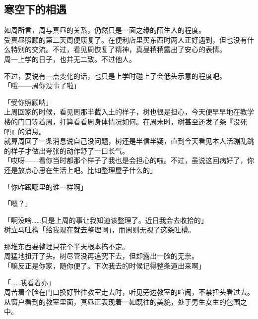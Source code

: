 \subsection{寒空下的相遇}

如周所言，周与真昼的关系，仍然只是一面之缘的陌生人的程度。\\

受真昼照顾的第二天周便康复了。在便利店里买东西时两人正好遇到，但也没有什么特别的交流。不过，看见周恢复了精神，真昼稍稍露出了安心的表情。\\

周一上学的日子，也并无二致。不过他人。

不过，要说有一点变化的话，也只是上学时碰上了会低头示意的程度吧。\\

「哦——周你没事了啦」

「受你照顾呐」\\

上周回家的时候，看见周那半截入土的样子，树也很是担心，今天便早早地在教学楼的门口等着周，打算看看周身体情况如何。在周末时，树甚至还发了条『没死吧』的消息。\\

就算周回了一条消息说自己没问题，树还是半信半疑，直到今天看见本人活蹦乱跳的样子才做出夸张的动作舒了一口长气。\\

「哎呀——看你当时都那个样子了我也是会担心的啦。不过，虽说这回病好了，你还是放点心思在生活上吧。比如整理屋子什么的」

「你咋跟哪里的谁一样啊」

「嗯？」

「啊没啥……只是上周的事让我知道该整理了。近日我会去收拾的」\\

树立马吐槽「给我现在就去整理啊」，而周则无视了这条吐槽。

那堆东西要整理只花个半天根本搞不定。\\

周猛地扭开了头。树尽管没再追究下去，但却露出一脸的无奈。\\

「嘛反正是你家，随你便了。下次我去的时候记得整条道出来啊」

「……我看着办」\\

周苦着个脸在门口换好鞋往教室走去时，听见旁边教室的喧闹，不禁扭头看过去。\\

从窗户看到的教室里面，真昼正表现着一如既往的美貌，处于男生女生的包围之中。

